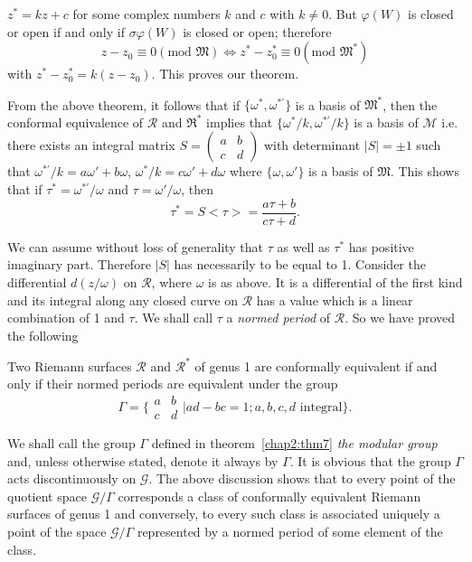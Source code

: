 $z^{\ast}=kz+c$ for some complex numbers $k$ and $c$ with $k\neq
0$. But $\varphi(W)$ is closed or open if and only if $\sigma
\varphi(W)$ is closed or open; therefore
$$
z-z_0 \equiv 0(\text{mod } \mathfrak{M}) \Leftrightarrow z^{\ast} -
z^{\ast}_0 \equiv 0(\text{mod } \mathfrak{M}^{\ast})
$$
with $z^{\ast}-z^{\ast}_0= k (z-z_0)$. This proves our theorem. 

From the above theorem, it follows that if $\{\omega^{\ast},
\omega^{\ast'}\}$ is a basis of $\mathfrak{M}^{\ast}$, then the
conformal equivalence of $\mathscr{R}$ and $\mathfrak{R}^{\ast}$
implies that $\{\omega^{\ast}/ k, \omega^{\ast '} /k\}$ is a basis of
$\mathscr{M}$ i.e. there exists an integral matrix
$S=\left(\begin{smallmatrix} a & b\\c&d\end{smallmatrix}
\right)$ with determinant $|S|=\pm 1$ such that $\omega^{\ast
  '}/k=a\omega'+b\omega$, $\omega^{\ast}/k = c\omega' +d\omega$ where
$\{\omega, \omega'\}$ is a basis of $\mathfrak{M}$. This shows that
if $\tau^{\ast} = \omega^{\ast '}/\omega$ and $\tau=\omega'/\omega$,
then 
$$
\tau^{\ast} = S<\tau> = \frac{a\tau + b}{c\tau + d}.
$$

We can assume without loss of generality that $\tau$ as well as
$\tau^{\ast}$ has positive imaginary part. Therefore $|S|$ has
necessarily to be equal to 1. Consider the differential $d(z/\omega)$
on $\mathscr{R}$, where $\omega$ is as above. It is a differential of
the first kind and its integral along any closed curve on
\pageoriginale $\mathscr{R}$ has a value which is a linear combination
of 1 and $\tau$. We shall call $\tau$ a \textit{normed period} of
$\mathscr{R}$. So we have proved the following 

\begin{thm}\label{chap2:thm7}
Two Riemann surfaces $\mathscr{R}$ and $\mathscr{R}^{\ast}$ of genus 1
are conformally equivalent if and only if their normed periods are
equivalent under the group 
$$
\Gamma = \{ \begin{matrix}
a&b\\c&d\end{matrix} | ad - bc = 1; a, b, c, d \text{ integral}\}.
$$
\end{thm}

We shall call the group $\Gamma$ defined in theorem~\ref{chap2:thm7} \textit{the
modular group} and, unless otherwise stated, denote it always by
$\Gamma$. It is obvious that the group $\Gamma$ acts discontinuously
on $\mathscr{G}$. The above discussion shows that to every point of
the quotient space $\mathscr{G}/\Gamma$ corresponds a class of
conformally equivalent Riemann surfaces of genus 1 and conversely, to
every such class is associated uniquely a point of the space
$\mathscr{G}/\Gamma$ represented by a normed period of some element of
the class.

